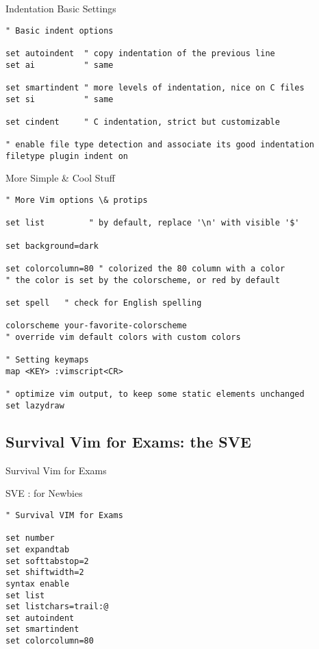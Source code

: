\documentclass{beamer}
\begin{document}
\begin{frame}[fragile]
  \begin{block}{Indentation Basic Settings}
\begin{verbatim}
" Basic indent options

set autoindent  " copy indentation of the previous line
set ai          " same

set smartindent " more levels of indentation, nice on C files
set si          " same

set cindent     " C indentation, strict but customizable

" enable file type detection and associate its good indentation
filetype plugin indent on
\end{verbatim}
  \end{block}
\end{frame}

\begin{frame}[fragile]
 \begin{block}{More Simple \& Cool Stuff}
\begin{verbatim}
" More Vim options \& protips

set list         " by default, replace '\n' with visible '$'

set background=dark

set colorcolumn=80 " colorized the 80 column with a color
" the color is set by the colorscheme, or red by default

set spell   " check for English spelling

colorscheme your-favorite-colorscheme
" override vim default colors with custom colors

" Setting keymaps
map <KEY> :vimscript<CR>

" optimize vim output, to keep some static elements unchanged
set lazydraw
\end{verbatim}
  \end{block}
\end{frame}

\subsection*{Survival Vim for Exams: the SVE}
\begin{frame}[fragile]{Survival Vim for Exams}
  \begin{block}{SVE : for Newbies}
  \begin{verbatim}
" Survival VIM for Exams

set number
set expandtab
set softtabstop=2
set shiftwidth=2
syntax enable
set list
set listchars=trail:@
set autoindent
set smartindent
set colorcolumn=80
  \end{verbatim}
  \end{block}
\end{frame}
\end{document}
